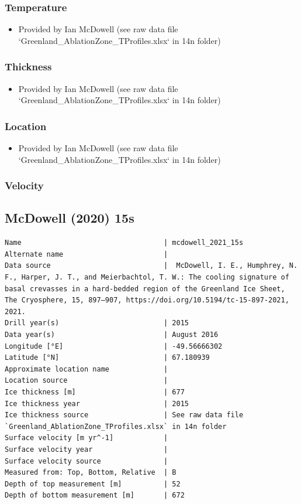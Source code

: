 \documentclass[article,a4paper,times,11pt,twoside]{article}
\begin{document}
\subsubsection{Temperature}
\label{sec:org7f90e01}

\begin{itemize}
\item Provided by Ian McDowell (see raw data file `Greenland\_AblationZone\_TProfiles.xlsx` in 14n folder)
\end{itemize}

\subsubsection{Thickness}
\label{sec:orgd5a74f4}

\begin{itemize}
\item Provided by Ian McDowell (see raw data file `Greenland\_AblationZone\_TProfiles.xlsx` in 14n folder)
\end{itemize}

\subsubsection{Location}
\label{sec:orgdeb5e8e}

\begin{itemize}
\item Provided by Ian McDowell (see raw data file `Greenland\_AblationZone\_TProfiles.xlsx` in 14n folder)
\end{itemize}

\subsubsection{Velocity}
\label{sec:org6e63375}
\clearpage
\subsection{McDowell (2020) 15s}
\label{sec:org6fcef40}
\begin{verbatim}
Name                                  | mcdowell_2021_15s
Alternate name                        | 
Data source                           |  McDowell, I. E., Humphrey, N. F., Harper, J. T., and Meierbachtol, T. W.: The cooling signature of basal crevasses in a hard-bedded region of the Greenland Ice Sheet, The Cryosphere, 15, 897–907, https://doi.org/10.5194/tc-15-897-2021, 2021.
Drill year(s)                         | 2015
Data year(s)                          | August 2016
Longitude [°E]                        | -49.56666302
Latitude [°N]                         | 67.180939
Approximate location name             | 
Location source                       | 
Ice thickness [m]                     | 677
Ice thickness year                    | 2015
Ice thickness source                  | See raw data file `Greenland_AblationZone_TProfiles.xlsx` in 14n folder
Surface velocity [m yr^-1]            | 
Surface velocity year                 | 
Surface velocity source               | 
Measured from: Top, Bottom, Relative  | B
Depth of top measurement [m]          | 52
Depth of bottom measurement [m]       | 672
\end{verbatim}
\end{document}
